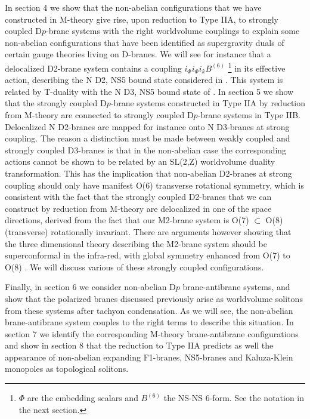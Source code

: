 \documentclass[12pt,a4paper]{article}
\begin{document}
In section 4 we show that the non-abelian configurations that we have
constructed in M-theory give rise, upon reduction to Type IIA, 
to strongly coupled D$p$-brane systems with the right
worldvolume couplings to
explain some non-abelian configurations that have been identified
as supergravity duals of certain gauge theories living on D-branes.
We will see for instance that a delocalized D2-brane system contains
a coupling $i_\Phi i_\Phi i_k B^{(6)}$ \footnote{$\Phi$ are the
embedding scalars and $B^{(6)}$ the NS-NS 6-form. See the notation
in the next section.} in its effective action, describing the
N D2, NS5 bound state considered in \cite{Bena}. This system is
related by T-duality with the N D3, NS5 bound state of \cite{PS}.
In section 5 we show that the strongly coupled D$p$-brane systems
constructed in Type IIA by reduction from M-theory are connected to
strongly coupled D$p$-brane systems in Type IIB. Delocalized N D2-branes
are mapped for instance onto N D3-branes at strong coupling. The reason a 
distinction must be made between weakly coupled and strongly coupled
D3-branes is that in the non-abelian case the corresponding actions
cannot be shown to be related by an SL(2,Z) worldvolume duality
transformation. This has the implication that non-abelian D2-branes at
strong coupling should only have manifest O(6) transverse rotational 
symmetry, which is consistent with the fact that the strongly coupled
D2-branes that we can construct by reduction from M-theory are
delocalized in one of the space directions, derived from the fact that
our M2-brane system is O(7) $\subset$ O(8) (transverse) rotationally
invariant.
There are arguments however showing that the three dimensional theory
describing the M2-brane system
should be superconformal in the infra-red, with global symmetry
enhanced from O(7) to O(8) \cite{SS,BS}.
We will discuss various of these strongly coupled configurations. 

Finally, in section 6 we consider non-abelian D$p$ brane-antibrane systems,
and show that the polarized branes discussed previously  
arise as worldvolume solitons from these systems after tachyon condensation.
As we will see,
the non-abelian brane-antibrane system couples to the right terms 
to describe this situation. In section 7
we identify the corresponding M-theory brane-antibrane configurations
and show in section 8 that the reduction to Type IIA predicts as well
the appearance
of non-abelian expanding F1-branes, 
NS5-branes and Kaluza-Klein monopoles as topological solitons.
\end{document}
